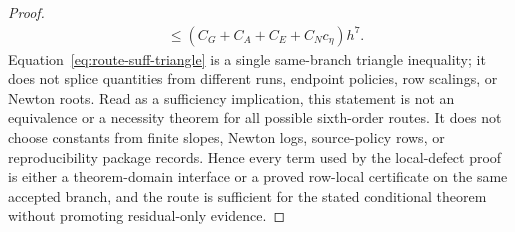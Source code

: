 \documentclass[preprint,12pt]{elsarticle}
\begin{document}
\begin{proof}
\begin{equation}
\begin{aligned}
  &\le (C_G+C_A+C_E+C_Nc_\eta)h^7 .
\end{aligned}
\end{equation}
Equation~\eqref{eq:route-suff-triangle} is a single same-branch triangle
inequality; it does not splice
quantities from different runs, endpoint policies, row scalings, or Newton
roots. Read as a sufficiency implication, this
statement is not an equivalence or a necessity theorem for all possible
sixth-order routes. It does not choose constants from finite slopes, Newton
logs, source-policy rows, or reproducibility package records. Hence every term used by the
local-defect proof is either a theorem-domain interface or a proved
row-local certificate on the same accepted branch, and the route is sufficient
for the stated conditional theorem without promoting residual-only evidence.
\end{proof}
\end{document}

